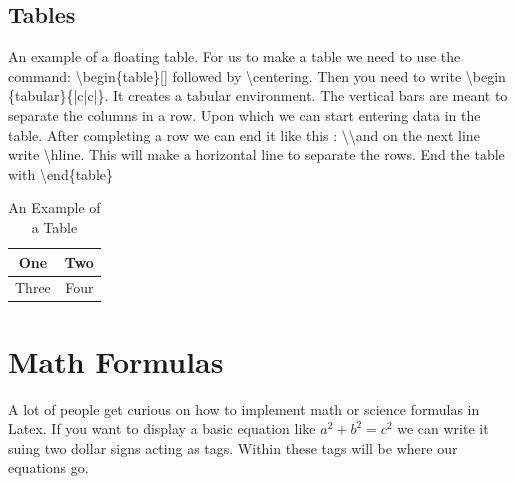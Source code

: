 \documentclass[12pt,journal,compsoc]{IEEEtran}
\begin{document}


\subsection{Tables}
An example of a floating table.
For us to make a table we need to use the command: \textbackslash begin\{table\}{[}{]}  followed by \textbackslash centering. Then you need to write \textbackslash begin \{tabular\}\{|c|c|\}. It creates a tabular environment. The vertical bars are meant to separate the columns in a row. Upon which we can start entering data in the table. After completing a row we can end it like this : \textbackslash \textbackslash and on the next line write \textbackslash hline. This will make a horizontal line to separate the rows.  End the table with \textbackslash end\{table\}
%
\begin{table}[h]
\renewcommand{\arraystretch}{1.3}
\caption{An Example of a Table}
\label{table_example}
\centering
\begin{tabular}{|c||c|}
\hline
One & Two\\
\hline
Three & Four\\
\hline
\end{tabular}
\end{table}

\section{Math Formulas}
A lot of people get curious on how to implement math or science formulas in Latex. If you want to display a basic equation like $a^2+b^2=c^2$ we can write it suing two dollar signs acting as tags. Within these tags will be where our equations go.
\end{document}
